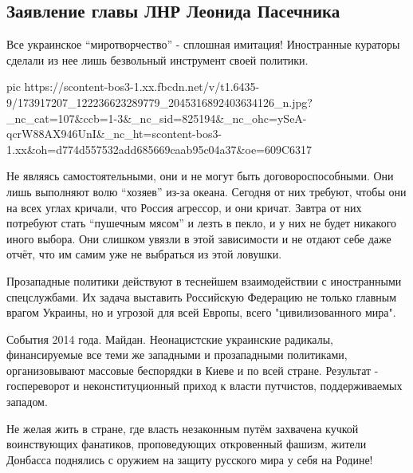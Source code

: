  
 
 
 
 

\subsection{Заявление главы ЛНР Леонида Пасечника}

Все украинское \enquote{миротворчество} - сплошная имитация! Иностранные кураторы
сделали из нее лишь безвольный инструмент своей политики.  

\ifcmt
  pic https://scontent-bos3-1.xx.fbcdn.net/v/t1.6435-9/173917207_122236623289779_2045316892403634126_n.jpg?_nc_cat=107&ccb=1-3&_nc_sid=825194&_nc_ohc=ySeA-qcrW88AX946UnI&_nc_ht=scontent-bos3-1.xx&oh=d774d557532add685669caab95c04a37&oe=609C6317
\fi

Не являясь самостоятельными, они и не могут быть договороспособными. Они лишь выполняют
волю \enquote{хозяев} из-за океана. Сегодня от них требуют, чтобы они на всех углах
кричали, что Россия агрессор, и они кричат. Завтра от них потребуют стать
\enquote{пушечным мясом} и лезть в пекло, и у них не будет никакого иного выбора. Они
слишком увязли в этой зависимости и не отдают себе даже отчёт, что им самим уже
не выбраться из этой ловушки.

Прозападные политики действуют в теснейшем взаимодействии с иностранными
спецслужбами. Их задача выставить Российскую Федерацию не только главным врагом
Украины, но и угрозой для всей Европы, всего "цивилизованного мира".

События 2014 года. Майдан. Неонацистские украинские радикалы, финансируемые все
теми же западными и прозападными политиками, организовывают массовые беспорядки
в Киеве и по всей стране. Результат - госпереворот и неконституционный приход к
власти путчистов, поддерживаемых западом.

Не желая жить в стране, где власть незаконным путём захвачена кучкой
воинствующих фанатиков, проповедующих откровенный фашизм, жители Донбасса
поднялись с оружием на защиту русского мира у себя на Родине!

